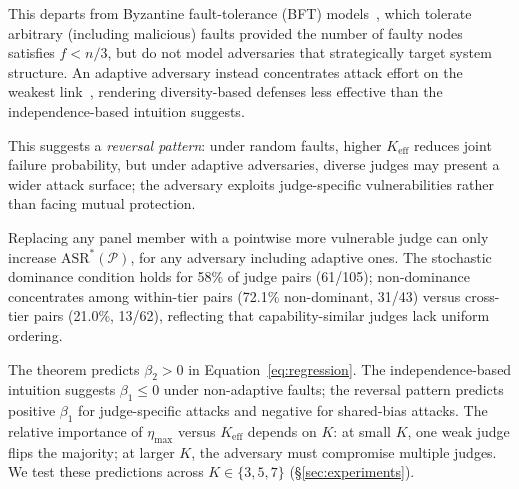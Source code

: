 This departs from Byzantine fault-tolerance (BFT) models~\cite{lamport1982byzantine,castro1999practical}, which tolerate arbitrary (including malicious) faults provided the number of faulty nodes satisfies $f < n/3$, but do not model adversaries that strategically target system structure. An adaptive adversary instead concentrates attack effort on the weakest link~\cite{schneier2000secrets}, rendering diversity-based defenses less effective than the independence-based intuition suggests.

This suggests a \emph{reversal pattern}: under random faults, higher $K_{\mathrm{eff}}$ reduces joint failure probability, but under adaptive adversaries, diverse judges may present a wider attack surface; the adversary exploits judge-specific vulnerabilities rather than facing mutual protection.

\begin{theorem}
\label{thm:monotonicity}
Replacing any panel member with a pointwise more vulnerable judge can only increase $\mathrm{ASR}^*(\mathcal{P})$, for any adversary including adaptive ones. The stochastic dominance condition holds for 58\% of judge pairs (61/105); non-dominance concentrates among within-tier pairs (72.1\% non-dominant, 31/43) versus cross-tier pairs (21.0\%, 13/62), reflecting that capability-similar judges lack uniform ordering.
\end{theorem}

The theorem predicts $\beta_2 > 0$ in Equation~\ref{eq:regression}. The independence-based intuition suggests $\beta_1 \leq 0$ under non-adaptive faults; the reversal pattern predicts positive $\beta_1$ for judge-specific attacks and negative for shared-bias attacks. The relative importance of $\eta_{\max}$ versus $K_{\mathrm{eff}}$ depends on $K$: at small $K$, one weak judge flips the majority; at larger $K$, the adversary must compromise multiple judges. We test these predictions across $K \in \{3,5,7\}$ (\S\ref{sec:experiments}).